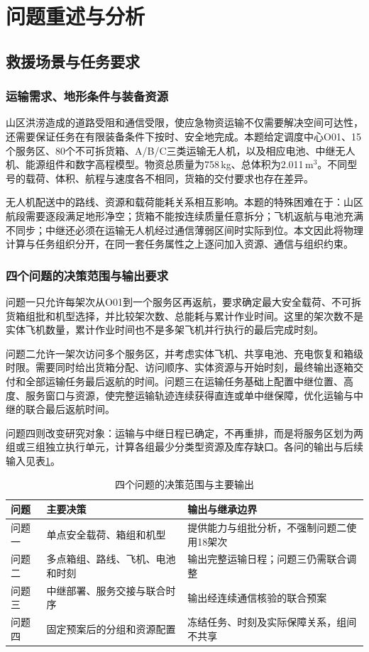 \section{问题重述与分析}
\label{sec:problem_analysis}

\subsection{救援场景与任务要求}
\subsubsection{运输需求、地形条件与装备资源}
山区洪涝造成的道路受阻和通信受限，使应急物资运输不仅需要解决空间可达性，还需要保证任务在有限装备条件下按时、安全地完成。本题给定调度中心O01、15个服务区、80个不可拆货箱、A/B/C三类运输无人机，以及相应电池、中继无人机、能源组件和数字高程模型。物资总质量为758\,kg、总体积为2.011\,m$^3$。不同型号的载荷、体积、航程与速度各不相同，货箱的交付要求也存在差异。

无人机配送中的路线、资源和载荷能耗关系相互影响\cite{dorling2017,murray2015fstsp}。本题的特殊困难在于：山区航段需要逐段满足地形净空；货箱不能按连续质量任意拆分；飞机返航与电池充满不同步；中继还必须在运输无人机经过通信薄弱区间时实际到位。本文因此将物理计算与任务组织分开，在同一套任务属性之上逐问加入资源、通信与组织约束。

\subsubsection{四个问题的决策范围与输出要求}
问题一只允许每架次从O01到一个服务区再返航，要求确定最大安全载荷、不可拆货箱组批和机型选择，并比较架次数、总能耗与累计作业时间。这里的架次数不是实体飞机数量，累计作业时间也不是多架飞机并行执行的最后完成时刻。

问题二允许一架次访问多个服务区，并考虑实体飞机、共享电池、充电恢复和箱级时限。需要同时给出货箱分配、访问顺序、实体资源与开始时刻，最终输出逐箱交付和全部运输任务最后返航的时间。问题三在运输任务基础上配置中继位置、高度、服务窗口与资源，使完整运输轨迹连续获得直连或单中继保障，优化运输与中继的联合最后返航时间。

问题四则改变研究对象：运输与中继日程已确定，不再重排，而是将服务区划为两组或三组独立执行单元，计算各组最少分类型资源及库存缺口。各问的输出与后续输入见表\ref{tab:problem_scope}。
\begin{table}[htbp]
\centering\small
\caption{四个问题的决策范围与主要输出}\label{tab:problem_scope}
\begin{tabularx}{\linewidth}{lXX}
\toprule
问题 & 主要决策 & 输出与继承边界\\
\midrule
问题一 & 单点安全载荷、箱组和机型 & 提供能力与组批分析，不强制问题二使用18架次\\
问题二 & 多点箱组、路线、飞机、电池和时刻 & 输出完整运输日程；问题三仍需联合调整\\
问题三 & 中继部署、服务交接与联合时序 & 输出经连续通信核验的联合预案\\
问题四 & 固定预案后的分组和资源配置 & 冻结任务、时刻及实际保障关系，组间不共享\\
\bottomrule
\end{tabularx}
\end{table}

